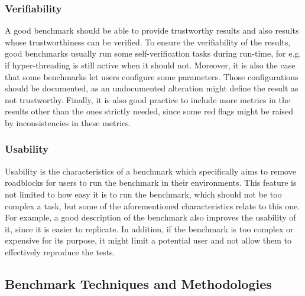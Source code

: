 \subsubsection{Verifiability}
A good benchmark should be able to provide trustworthy results and also results whose trustworthiness can be verified. To ensure the verifiability of the results, good benchmarks usually run some self-verification tasks during run-time, for e.g. if hyper-threading is still active when it should not. Moreover, it is also the case that some benchmarks let users configure some parameters. Those configurations should be documented, as an undocumented alteration might define the result as not trustworthy. \cite{how_to_bench}
Finally, it is also good practice to include more metrics in the results other than the ones strictly needed, since some red flags might be raised by inconsistencies in these metrics. 
\subsubsection{Usability}
Usability is the characteristics of a benchmark which specifically aims to remove roadblocks for users to run the benchmark in their environments. This feature is not limited to how easy it is to run the benchmark, which should not be too complex a task, but some of the aforementioned characteristics relate to this one. For example, a good description of the benchmark also improves the usability of it, since it is easier to replicate. In addition, if the benchmark is too complex or expensive for its purpose, it might limit a potential user and not allow them to effectively reproduce the tests. 



\subsection{Benchmark Techniques and Methodologies}\label{BTaM}

